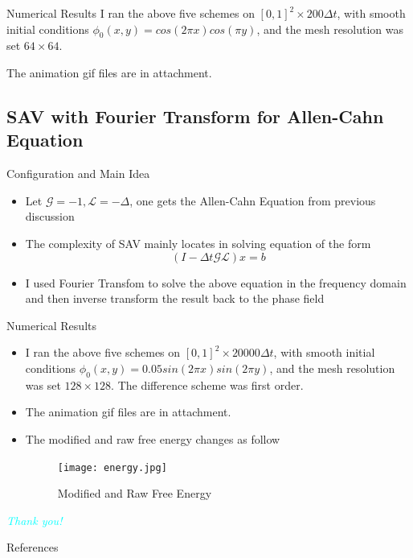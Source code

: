 \documentclass[9pt]{beamer}
\begin{document}
\begin{frame}{Numerical Results}
I ran the above five schemes on $[0,1]^2 \times 200\Delta t $, with smooth initial conditions $\phi_0(x,y) = cos(2\pi x)cos(\pi y)$, and the mesh resolution was set $64\times64$.

The animation gif files are in attachment.
\end{frame}

\subsection{SAV with Fourier Transform for Allen-Cahn Equation}
\begin{frame}{Configuration and Main Idea}
\begin{itemize}
\item{Let $\mathcal G=-1, \mathcal L = -\Delta$, one gets the Allen-Cahn Equation from previous discussion}\item{The complexity of SAV mainly locates in solving equation of the form $$(I-\Delta t \mathcal{G L}) x = b$$}\item{I used Fourier Transfom to solve the above equation in the frequency domain and then inverse transform the result back to the phase field}
\end{itemize}
\end{frame}

\begin{frame}{Numerical Results}
\begin{itemize}
\item{I ran the above five schemes on $[0,1]^2 \times 20000\Delta t $, with smooth initial conditions $\phi_0(x,y) = 0.05 sin(2\pi x)sin(2\pi y)$, and the mesh resolution was set $128\times128$. The difference scheme was first order.}
\item{
The animation gif files are in attachment.}
\item{
The modified and raw free energy changes as follow
 \begin{figure}[H]
  \centering
  \texttt{[image: energy.jpg]}
 \caption{Modified and Raw Free Energy}
 \label{fig:1}
\end{figure}}
\end{itemize}
\end{frame}

\begin{frame}
 \begin{center}
{\huge \emph{\textcolor{cyan}{Thank you!}}}\\
\end{center}
\end{frame}

\nocite{*}
\begin{frame}[allowframebreaks]{References}
	
	
\end{frame}
\end{document}
